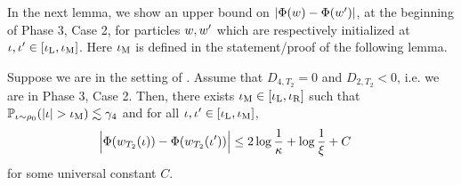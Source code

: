 In the next lemma, we show an upper bound on $|\Phi(w) - \Phi(w')|$, at the beginning of Phase 3, Case 2, for particles $w, w'$ which are respectively initialized at $\iota, \iota' \in [\iota_{\textup{L}}, \iota_{\textup{M}}]$. Here $\iota_{\textup{M}}$ is defined in the statement/proof of the following lemma.

\begin{lemma} \label{lemma:case_2_initial_potential}
Suppose we are in the setting of . Assume that $D_{4, T_2} = 0$ and $D_{2, T_2} < 0$, i.e. we are in Phase 3, Case 2. Then, there exists $\iota_{\textup{M}} \in [\iota_{\textup{L}}, \iota_{\textup{R}}]$ such that $\mathbb{P}_{\iota \sim \rho_0}(|\iota| > \iota_{\textup{M}}) \lesssim \gamma_4$ and for all $\iota, \iota' \in [\iota_{\textup{L}}, \iota_{\textup{M}}]$,
\begin{align}
\Big|\Phi(w_{T_2}(\iota)) - \Phi(w_{T_2}(\iota'))\Big|
& \leq 2 \log \frac{1}{\kappa} + \log \frac{1}{\xi} + C
\end{align}
for some universal constant $C$.
\end{lemma}
